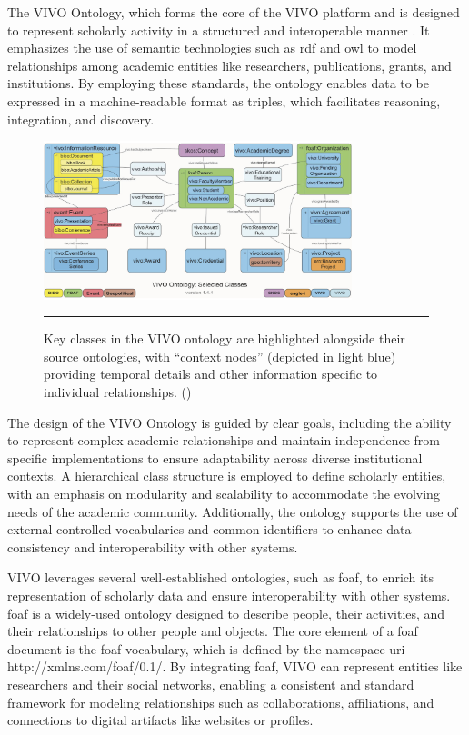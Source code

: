 The VIVO Ontology, which forms the core of the VIVO platform and is designed to represent scholarly activity in a structured and interoperable manner \cite{VIVO}.
It emphasizes the use of semantic technologies such as \gls{rdf} and \gls{owl} to model relationships among academic entities like researchers, publications, grants, and institutions.
By employing these standards, the ontology enables data to be expressed in a machine-readable format as triples, which facilitates reasoning, integration, and discovery.

\begin{figure}[htbp]
    \centering
 \includegraphics[width=0.8\textwidth]{03_Figures/literature-review/vivo-ontology.png}
     \rule{35em}{0.5pt}
    \caption{Key classes in the VIVO ontology are highlighted alongside their source ontologies, with ``context nodes'' (depicted in light blue) providing temporal details and other information specific to individual relationships. (\textcite{VIVO})}
 \label{fig:vivo-ontology}
\end{figure}

The design of the VIVO Ontology is guided by clear goals, including the ability to represent complex academic relationships and maintain independence from specific implementations to ensure adaptability across diverse institutional contexts.
A hierarchical class structure is employed to define scholarly entities, with an emphasis on modularity and scalability to accommodate the evolving needs of the academic community.
Additionally, the ontology supports the use of external controlled vocabularies and common identifiers to enhance data consistency and interoperability with other systems.

VIVO leverages several well-established ontologies, such as \gls{foaf}, to enrich its representation of scholarly data and ensure interoperability with other systems.
\gls{foaf} is a widely-used ontology designed to describe people, their activities, and their relationships to other people and objects.
The core element of a \gls{foaf} document is the \gls{foaf} vocabulary, which is defined by the namespace \gls{uri} http://xmlns.com/foaf/0.1/.
By integrating \gls{foaf}, VIVO can represent entities like researchers and their social networks, enabling a consistent and standard framework for modeling relationships such as collaborations, affiliations, and connections to digital artifacts like websites or profiles.

